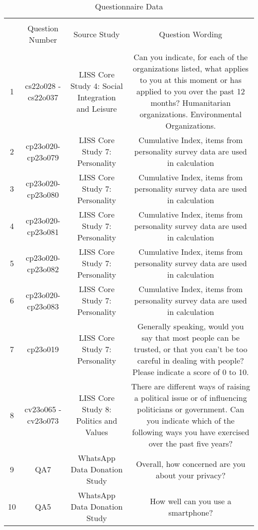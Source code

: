 
\begin{table}[!htbp] \centering 
  \caption{Questionnaire Data} 
  \label{} 
\begin{tabular}{@{\extracolsep{5pt}} cccc} 
\\[-1.8ex]\hline 
\hline \\[-1.8ex] 
 & Question Number & Source Study & Question Wording \\ 
\hline \\[-1.8ex] 
1 & cs22o028 - cs22o037 & LISS Core Study 4: Social Integration and Leisure & Can you indicate, for each of the organizations listed, what applies to you at this moment or has applied to you over the past 12 months? Humanitarian organizations. Environmental Organizations. \\ 
2 & cp23o020-cp23o079 & LISS Core Study 7: Personality & Cumulative Index,  items from personality survey data are used in calculation \\ 
3 & cp23o020-cp23o080 & LISS Core Study 7: Personality & Cumulative Index,  items from personality survey data are used in calculation \\ 
4 & cp23o020-cp23o081 & LISS Core Study 7: Personality & Cumulative Index,  items from personality survey data are used in calculation \\ 
5 & cp23o020-cp23o082 & LISS Core Study 7: Personality & Cumulative Index,  items from personality survey data are used in calculation \\ 
6 & cp23o020-cp23o083 & LISS Core Study 7: Personality & Cumulative Index,  items from personality survey data are used in calculation \\ 
7 & cp23o019 & LISS Core Study 7: Personality & Generally speaking, would you say that most people can be trusted, or that you can’t be too careful in dealing with people? Please indicate a score of 0 to 10. \\ 
8 & cv23o065 - cv23o073 & LISS Core Study 8: Politics and Values & There are different ways of raising a political issue or of influencing politicians or government. Can you indicate which of the following ways you have exercised over the past five years? \\ 
9 & QA7 & WhatsApp Data Donation Study & Overall, how concerned are you about your privacy? \\ 
10 & QA5 & WhatsApp Data Donation Study & How well can you use a smartphone? \\ 

\end{tabular}
\end{table}
